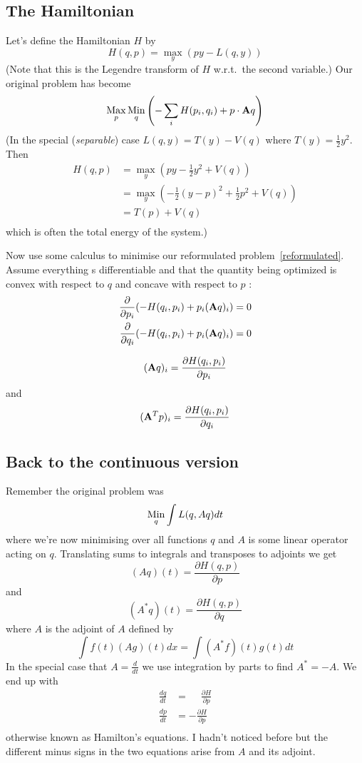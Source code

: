 \documentclass{article}
\begin{document}
\subsection{The Hamiltonian}
Let's define the Hamiltonian $H$ by
\[
H(q,p)=\max_y(py-L(q,y))
\]
(Note that this is the Legendre transform of $H$ w.r.t.\ the second variable.)
Our original problem has become
\begin{equation}
\mathop{\mathrm{Max}}_p\mathop{\mathrm{Min}}_q\left(-\sum_iH(p_i,q_i)+p\cdot\mathbf{A} q\right)
\label{reformulated}
\end{equation}
(In the special (\emph{separable}) case $L(q,y)=T(y)-V(q)$ where $T(y)=\frac{1}{2}y^2$.
Then
\begin{align*}
H(q,p)&=\max_y(py-\frac{1}{2}y^2+V(q))\\
&=\max_y(-\frac{1}{2}(y-p)^2+\frac{1}{2}p^2+V(q))\\
&=T(p)+V(q)\\
\end{align*}
which is often the total energy of the system.)

Now use some calculus to minimise our reformulated problem~\ref{reformulated}.
Assume everything s differentiable and that the quantity being optimized is convex with respect to $q$ and concave with respect to $p$ \cite{bogosel}:
\begin{align*}
\frac{\partial}{\partial p_i}(-H(q_i,p_i)+p_i(\mathbf{A} q)_i)&=0\\
\frac{\partial}{\partial q_i}(-H(q_i,p_i)+p_i(\mathbf{A} q)_i)&=0\\
\end{align*}

\[
(\mathbf{A} q)_i=\frac{\partial H(q_i,p_i)}{\partial p_i}
\]
and
\[
(\mathbf{A}^T p)_i=\frac{\partial H(q_i,p_i)}{\partial q_i}
\]

\subsection{Back to the continuous version}
Remember the original problem was
\[
\mathop{\mathrm{Min}}_q\int L(q,Aq)dt
\]
where we're now minimising over all functions $q$ and $A$ is some linear operator acting on $q$.
Translating sums to integrals and transposes to adjoints we get
\[
(Aq)(t)=\frac{\partial H(q,p)}{\partial p}
\]
and
\[
(A^\ast q)(t)=\frac{\partial H(q,p)}{\partial q}
\]
where $A$ is the adjoint of $A$ defined by
\[
\int f(t)(Ag)(t)dx=\int (A^\ast f)(t)g(t)dt
\]
In the special case that $A=\frac{d}{dt}$ we use integration by parts to find $A^\ast=-A$.
We end up with
\begin{align*}
\frac{dq}{dt}&=\phantom{-}\frac{\partial H}{\partial p}\\
\frac{dp}{dt}&=-\frac{\partial H}{\partial p}\\
\end{align*}
otherwise known as Hamilton's equations.
I hadn't noticed before but the different minus signs in the two equations arise from $A$ and its adjoint.
\end{document}
